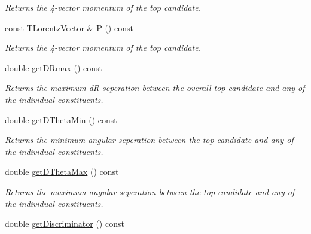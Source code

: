 \begin{DoxyCompactItemize}
\begin{DoxyCompactList}\small\item\em Returns the 4-\/vector momentum of the top candidate. \end{DoxyCompactList}\item 
\hypertarget{classTopObject_ac59c3a52925131b1ea7e5bf5c014aa2d}{const T\-Lorentz\-Vector \& \hyperlink{classTopObject_ac59c3a52925131b1ea7e5bf5c014aa2d}{P} () const }\label{classTopObject_ac59c3a52925131b1ea7e5bf5c014aa2d}

\begin{DoxyCompactList}\small\item\em Returns the 4-\/vector momentum of the top candidate. \end{DoxyCompactList}\item 
\hypertarget{classTopObject_ad6c8e1a0ef46d400075b1c2dbb05e37d}{double \hyperlink{classTopObject_ad6c8e1a0ef46d400075b1c2dbb05e37d}{get\-D\-Rmax} () const }\label{classTopObject_ad6c8e1a0ef46d400075b1c2dbb05e37d}

\begin{DoxyCompactList}\small\item\em Returns the maximum d\-R seperation between the overall top candidate and any of the individual constituents. \end{DoxyCompactList}\item 
\hypertarget{classTopObject_a6751962b83bc4b348cebee05aa23c299}{double \hyperlink{classTopObject_a6751962b83bc4b348cebee05aa23c299}{get\-D\-Theta\-Min} () const }\label{classTopObject_a6751962b83bc4b348cebee05aa23c299}

\begin{DoxyCompactList}\small\item\em Returns the minimum angular seperation between the top candidate and any of the individual constituents. \end{DoxyCompactList}\item 
\hypertarget{classTopObject_afd9525b26ff81392af3773c5c88f2f68}{double \hyperlink{classTopObject_afd9525b26ff81392af3773c5c88f2f68}{get\-D\-Theta\-Max} () const }\label{classTopObject_afd9525b26ff81392af3773c5c88f2f68}

\begin{DoxyCompactList}\small\item\em Returns the maximum angular seperation between the top candidate and any of the individual constituents. \end{DoxyCompactList}\item 
\hypertarget{classTopObject_a144b61f5139eb1bef7bc00cee17deaf7}{double \hyperlink{classTopObject_a144b61f5139eb1bef7bc00cee17deaf7}{get\-Discriminator} () const }\label{classTopObject_a144b61f5139eb1bef7bc00cee17deaf7}


\end{DoxyCompactItemize}

